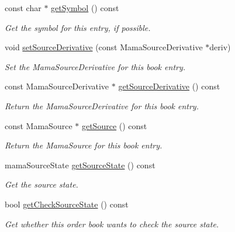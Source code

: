 \begin{CompactItemize}
const char $\ast$ \hyperlink{classWombat_1_1MamdaOrderBookEntry_fe56862c94f658e8d505bf9b3d2633e9}{get\-Symbol} () const 
\begin{CompactList}\small\item\em Get the symbol for this entry, if possible. \item\end{CompactList}\item 
void \hyperlink{classWombat_1_1MamdaOrderBookEntry_5b88fb6172c7418c6e92043d6b74a631}{set\-Source\-Derivative} (const Mama\-Source\-Derivative $\ast$deriv)
\begin{CompactList}\small\item\em Set the Mama\-Source\-Derivative for this book entry. \item\end{CompactList}\item 
const Mama\-Source\-Derivative $\ast$ \hyperlink{classWombat_1_1MamdaOrderBookEntry_9a41b69fc139d40f295771c0ca49c294}{get\-Source\-Derivative} () const 
\begin{CompactList}\small\item\em Return the Mama\-Source\-Derivative for this book entry. \item\end{CompactList}\item 
const Mama\-Source $\ast$ \hyperlink{classWombat_1_1MamdaOrderBookEntry_cda4031007b43ade5911dd36d015baf5}{get\-Source} () const 
\begin{CompactList}\small\item\em Return the Mama\-Source for this book entry. \item\end{CompactList}\item 
mama\-Source\-State \hyperlink{classWombat_1_1MamdaOrderBookEntry_e119e549d0645a5d67d1d2ee465c0f46}{get\-Source\-State} () const 
\begin{CompactList}\small\item\em Get the source state. \item\end{CompactList}\item 
bool \hyperlink{classWombat_1_1MamdaOrderBookEntry_60be50a62ad2b949f2ddf9d0a7d842fd}{get\-Check\-Source\-State} () const 
\begin{CompactList}\small\item\em Get whether this order book wants to check the source state. \item\end{CompactList}\item 

\end{CompactItemize}
